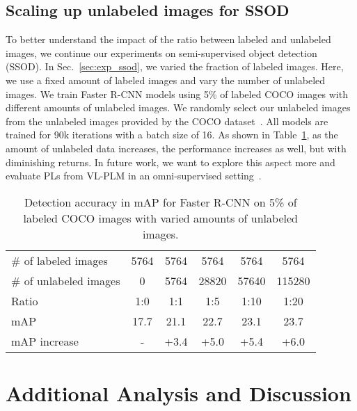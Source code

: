 \documentclass[runningheads]{llncs}
\begin{document}
\subsection{Scaling up unlabeled images for SSOD}
\label{subsec:more_unlabeled}
To better understand the impact of the ratio between labeled and unlabeled images, we continue our experiments on semi-supervised object detection (SSOD). In Sec.~\ref{sec:exp_ssod}, we varied the fraction of labeled images. Here, we use a fixed amount of labeled images and vary the number of unlabeled images.
We train Faster R-CNN models using 5\% of labeled COCO images with different amounts of unlabeled images. 
We randomly select our unlabeled images from the unlabeled images provided by the COCO dataset~\cite{COCO}.
All models are trained for 90k iterations with a batch size of 16. As shown in Table~\ref{tab:AP_data_ratio}, as the amount of unlabeled data increases, the performance increases as well, but with diminishing returns. In future work, we want to explore this aspect more and evaluate PLs from VL-PLM in an omni-supervised setting~\cite{radosavovic2018cvpr_omnisupervised}.



\setlength{\tabcolsep}{8pt}
\begin{table}\begin{center}
\caption{
Detection accuracy in mAP for Faster R-CNN on 5\% of labeled COCO images with varied amounts of unlabeled images.
}
\label{tab:AP_data_ratio}
\begin{tabular}{l |c|c|c|c|c}
    \toprule
    \# of labeled images & 5764 & 5764 & 5764 & 5764 & 5764 \\
    \# of unlabeled images & 0 & 5764 & 28820 & 57640 & 115280 \\
    Ratio      & 1:0 & 1:1 & 1:5 & 1:10 & 1:20 \\
\hline
mAP & 17.7 & 21.1 & 22.7 & 23.1 & 23.7 \\
    mAP increase & - & +3.4 & +5.0 & +5.4 & +6.0 \\
    \bottomrule
    \end{tabular}
\end{center}
\end{table}
\setlength{\tabcolsep}{1.4pt}



\section{Additional Analysis and Discussion}
\end{document}
